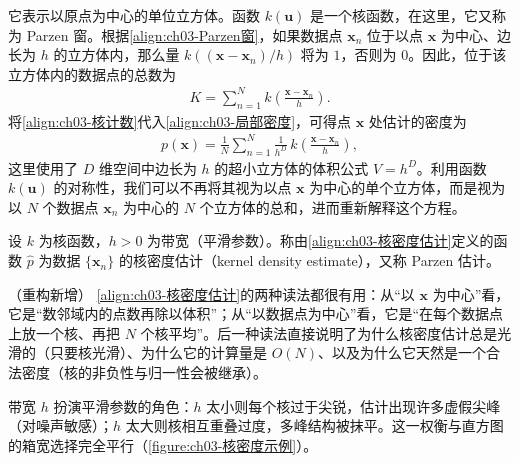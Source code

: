 \documentclass[../../main.tex]{subfiles}
\begin{document}
它表示以原点为中心的单位立方体。函数 $k(\boldsymbol{u})$ 是一个核函数，在这里，它又称为 Parzen 窗。根据\eqref{align:ch03-Parzen窗}，如果数据点 $\boldsymbol{x}_n$ 位于以点 $\boldsymbol{x}$ 为中心、边长为 $h$ 的立方体内，那么量 $k((\boldsymbol{x}-\boldsymbol{x}_n)/h)$ 将为 $1$，否则为 $0$。因此，位于该立方体内的数据点的总数为
\begin{align}
K=\sum_{n=1}^{N}k\left(\frac{\boldsymbol{x}-\boldsymbol{x}_n}{h}\right).
\label{align:ch03-核计数}
\end{align}
将\eqref{align:ch03-核计数}代入\eqref{align:ch03-局部密度}，可得点 $\boldsymbol{x}$ 处估计的密度为
\begin{align}
p(\boldsymbol{x})=\frac{1}{N}\sum_{n=1}^{N}\frac{1}{h^{D}}\,k\!\left(\frac{\boldsymbol{x}-\boldsymbol{x}_n}{h}\right),
\label{align:ch03-核密度估计}
\end{align}
这里使用了 $D$ 维空间中边长为 $h$ 的超小立方体的体积公式 $V=h^{D}$。利用函数 $k(\boldsymbol{u})$ 的对称性，我们可以不再将其视为以点 $\boldsymbol{x}$ 为中心的单个立方体，而是视为以 $N$ 个数据点 $\boldsymbol{x}_n$ 为中心的 $N$ 个立方体的总和，进而重新解释这个方程。

\begin{definition}[核密度估计]\label{definition:ch03-核密度}
设 $k$ 为核函数，$h>0$ 为带宽（平滑参数）。称由\eqref{align:ch03-核密度估计}定义的函数 $\hat{p}$ 为数据 $\{\boldsymbol{x}_n\}$ 的核密度估计（kernel density estimate），又称 Parzen 估计。
\end{definition}

\begin{remark}（重构新增）
\eqref{align:ch03-核密度估计}的两种读法都很有用：从“以 $\boldsymbol{x}$ 为中心”看，它是“数邻域内的点数再除以体积”；从“以数据点为中心”看，它是“在每个数据点上放一个核、再把 $N$ 个核平均”。后一种读法直接说明了为什么核密度估计总是光滑的（只要核光滑）、为什么它的计算量是 $O(N)$、以及为什么它天然是一个合法密度（核的非负性与归一性会被继承）。

带宽 $h$ 扮演平滑参数的角色：$h$ 太小则每个核过于尖锐，估计出现许多虚假尖峰（对噪声敏感）；$h$ 太大则核相互重叠过度，多峰结构被抹平。这一权衡与直方图的箱宽选择完全平行（\cref{figure:ch03-核密度示例}）。
\end{remark}
\end{document}
